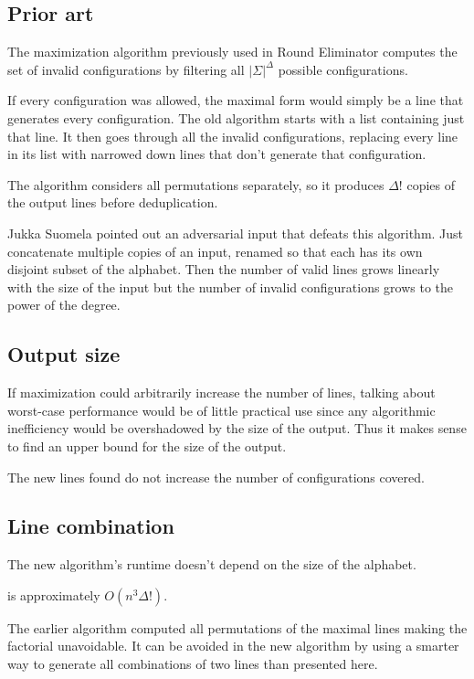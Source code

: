 \documentclass[english, 12pt, a4paper, sci, a-1b, online]{aaltothesis}
\begin{document}
\subsection{Prior art}

The maximization algorithm previously used in Round Eliminator computes the set of invalid configurations by filtering all $|\Sigma|^{\Delta}$ possible configurations.

If every configuration was allowed, the maximal form would simply be a line that generates every configuration. The old algorithm starts with a list containing just that line. It then goes through all the invalid configurations, replacing every line in its list with narrowed down lines that don't generate that configuration.

The algorithm considers all permutations separately, so it produces $\Delta!$ copies of the output lines before deduplication.


Jukka Suomela pointed out an adversarial input that defeats this algorithm. Just concatenate multiple copies of an input, renamed so that each has its own disjoint subset of the alphabet. Then the number of valid lines grows linearly with the size of the input but the number of invalid configurations grows to the power of the degree.

\subsection{Output size}

If maximization could arbitrarily increase the number of lines, talking about worst-case performance would be of little practical use since any algorithmic inefficiency would be overshadowed by the size of the output. Thus it makes sense to find an upper bound for the size of the output.

The new lines found do not increase the number of configurations covered.

\subsection{Line combination}

The new algorithm's runtime doesn't depend on the size of the alphabet.

is approximately $O(n^{3}\Delta!)$.

The earlier algorithm computed all permutations of the maximal lines making the factorial unavoidable. It can be avoided in the new algorithm by using a smarter way to generate all combinations of two lines than presented here. 
\end{document}
